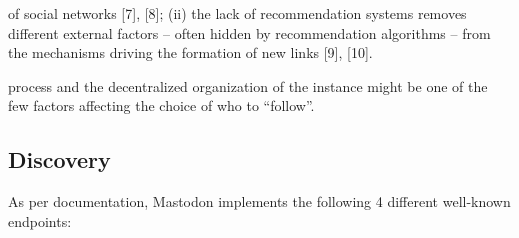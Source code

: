 of social networks [7], [8]; (ii) the lack of recommendation systems removes different external factors – often hidden by recommendation algorithms – from the mechanisms driving the formation of new links [9], [10].

process and the decentralized organization of the instance might be one of the few factors affecting the choice of who to “follow”.

\subsection{Discovery}

\cite{nottingham_2019}
As per documentation, Mastodon implements the following 4 different well-known endpoints: 



